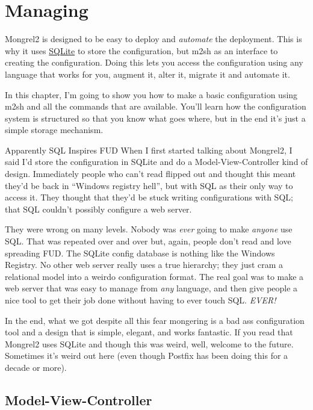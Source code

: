 \chapter{Managing}

Mongrel2 is designed to be easy to deploy and \emph{automate} the deployment.
This is why it uses \href{http://www.sqlite.org/}{SQLite} to store the configuration,
but m2sh as an interface to creating the configuration.  Doing this lets
you access the configuration using any language that works for you, augment it,
alter it, migrate it and automate it.

In this chapter, I'm going to show you how to make a basic configuration using
m2sh and all the commands that are available.  You'll learn how the configuration
system is structured so that you know what goes where, but in the end it's just
a simple storage mechanism.

\begin{aside}{Apparently SQL Inspires FUD}
When I first started talking about Mongrel2, I said I'd store the configuration
in SQLite and do a Model-View-Controller kind of design.  Immediately people who
can't read flipped out and thought this meant they'd be back in ``Windows registry hell'',
but with SQL as their only way to access it.  They thought that they'd be stuck writing
configurations with SQL; that SQL couldn't possibly configure a web server.

They were wrong on many levels.  Nobody was \emph{ever} going to make \emph{anyone} use
SQL.  That was repeated over and over but, again, people don't read and love spreading
FUD.  The SQLite config database is nothing like the Windows Registry.  No other web
server really uses a true hierarchy; they just cram a relational model into a weirdo
configuration format.  The real goal was to make a web server that was easy to manage from
\emph{any} language, and then give people a nice tool to get their job done without
having to ever touch SQL.  \emph{EVER!}

In the end, what we got despite all this fear mongering is a bad ass configuration
tool and a design that is simple, elegant, and works fantastic.  If you read that
Mongrel2 uses SQLite and though this was weird, well, welcome to the future.  Sometimes
it's weird out here (even though Postfix has been doing this for a decade or more).
\end{aside}


\section{Model-View-Controller}

